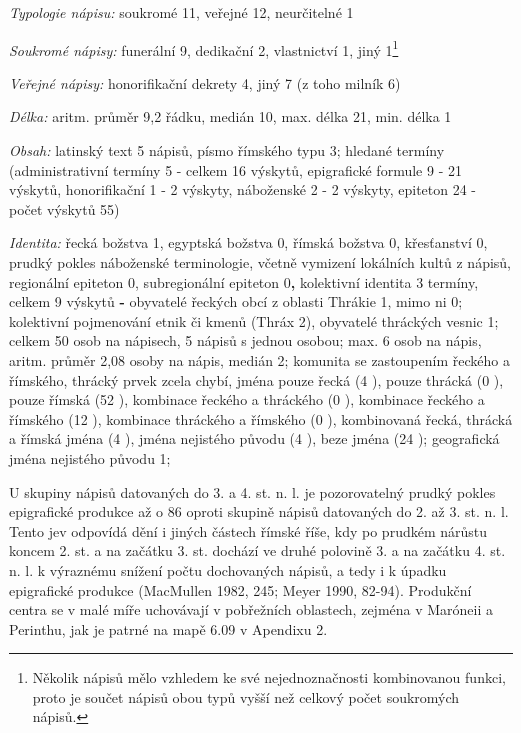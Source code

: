 {\em Typologie nápisu:} soukromé 11, veřejné 12, neurčitelné 1

{\em Soukromé nápisy:} funerální 9, dedikační 2, vlastnictví 1, jiný 1\footnote{Několik nápisů mělo vzhledem ke své nejednoznačnosti kombinovanou funkci, proto je součet nápisů obou typů vyšší než celkový počet soukromých nápisů.}

{\em Veřejné nápisy:} honorifikační dekrety 4, jiný 7 (z toho milník 6)

{\em Délka:} aritm. průměr 9,2 řádku, medián 10, max. délka 21, min. délka 1

{\em Obsah:} latinský text 5 nápisů, písmo římského typu 3; hledané termíny (administrativní termíny 5 - celkem 16 výskytů, epigrafické formule 9 - 21 výskytů, honorifikační 1 - 2 výskyty, náboženské 2 - 2 výskyty, epiteton 24 - počet výskytů 55)

{\em Identita:} řecká božstva 1, egyptská božstva 0, římská božstva 0, křesťanství 0, prudký pokles náboženské terminologie, včetně vymizení lokálních kultů z nápisů, regionální epiteton 0, subregionální epiteton 0{\bf ,} kolektivní identita 3 termíny, celkem 9 výskytů {\bf -} obyvatelé řeckých obcí z oblasti Thrákie 1, mimo ni 0; kolektivní pojmenování etnik či kmenů (Thráx 2), obyvatelé thráckých vesnic 1; celkem 50 osob na nápisech, 5 nápisů s jednou osobou; max. 6 osob na nápis, aritm. průměr 2,08 osoby na nápis, medián 2; komunita se zastoupením řeckého a římského, thrácký prvek zcela chybí, jména pouze řecká (4 ), pouze thrácká (0 ), pouze římská (52 ), kombinace řeckého a thráckého (0 ), kombinace řeckého a římského (12 ), kombinace thráckého a římského (0 ), kombinovaná řecká, thrácká a římská jména (4 ), jména nejistého původu (4 ), beze jména (24 ); geografická jména nejistého původu 1;

\NC\AR
\HL
\HL
\stoptable

U skupiny nápisů datovaných do 3. a 4. st. n. l. je pozorovatelný prudký pokles epigrafické produkce až o 86  oproti skupině nápisů datovaných do 2. až 3. st. n. l. Tento jev odpovídá dění i jiných částech římské říše, kdy po prudkém nárůstu koncem 2. st. a na začátku 3. st. dochází ve druhé polovině 3. a na začátku 4. st. n. l. k výraznému snížení počtu dochovaných nápisů, a tedy i k úpadku epigrafické produkce (MacMullen 1982, 245; Meyer 1990, 82-94). Produkční centra se v malé míře uchovávají v pobřežních oblastech, zejména v Maróneii a Perinthu, jak je patrné na mapě 6.09 v Apendixu 2.

